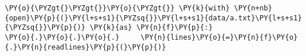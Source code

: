 \begin{Verbatim}[commandchars=\\\{\}]
\PY{o}{\PYZgt{}\PYZgt{}}\PY{o}{\PYZgt{}} \PY{k}{with} \PY{n+nb}{open}\PY{p}{(}\PY{l+s+s1}{\PYZsq{}}\PY{l+s+s1}{data/a.txt}\PY{l+s+s1}{\PYZsq{}}\PY{p}{)} \PY{k}{as} \PY{n}{f}\PY{p}{:}
\PY{o}{.}\PY{o}{.}\PY{o}{.}     \PY{n}{lines}\PY{o}{=}\PY{n}{f}\PY{o}{.}\PY{n}{readlines}\PY{p}{(}\PY{p}{)}
\end{Verbatim}

